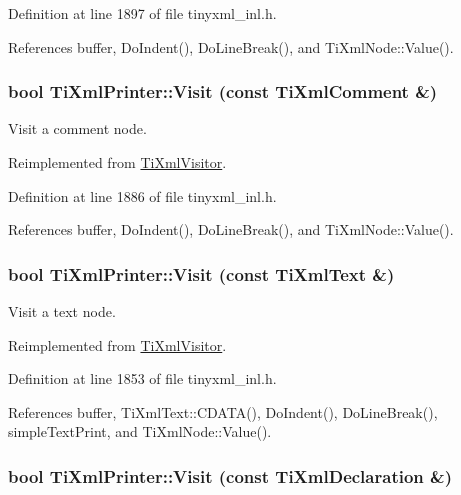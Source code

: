 Definition at line 1897 of file tinyxml\_\-inl.h.

References buffer, DoIndent(), DoLineBreak(), and TiXmlNode::Value().\hypertarget{class_ti_xml_printer_a9870423f5603630e6142f6bdb66dfb57}{
\subsubsection[{Visit}]{\setlength{\rightskip}{0pt plus 5cm}bool TiXmlPrinter::Visit (const {\bf TiXmlComment} \&)}}
\label{class_ti_xml_printer_a9870423f5603630e6142f6bdb66dfb57}


Visit a comment node. 

Reimplemented from \hyperlink{class_ti_xml_visitor_a53a60e7a528627b31af3161972cc7fa2}{TiXmlVisitor}.

Definition at line 1886 of file tinyxml\_\-inl.h.

References buffer, DoIndent(), DoLineBreak(), and TiXmlNode::Value().\hypertarget{class_ti_xml_printer_a0857c5d32c59b9a257f9a49cb9411df5}{
\subsubsection[{Visit}]{\setlength{\rightskip}{0pt plus 5cm}bool TiXmlPrinter::Visit (const {\bf TiXmlText} \&)}}
\label{class_ti_xml_printer_a0857c5d32c59b9a257f9a49cb9411df5}


Visit a text node. 

Reimplemented from \hyperlink{class_ti_xml_visitor_a399b8ebca5cd14664974a32d2ce029e5}{TiXmlVisitor}.

Definition at line 1853 of file tinyxml\_\-inl.h.

References buffer, TiXmlText::CDATA(), DoIndent(), DoLineBreak(), simpleTextPrint, and TiXmlNode::Value().\hypertarget{class_ti_xml_printer_adaf7eec4dc43ad071ff52b60361574f5}{
\subsubsection[{Visit}]{\setlength{\rightskip}{0pt plus 5cm}bool TiXmlPrinter::Visit (const {\bf TiXmlDeclaration} \&)}}
\label{class_ti_xml_printer_adaf7eec4dc43ad071ff52b60361574f5}


